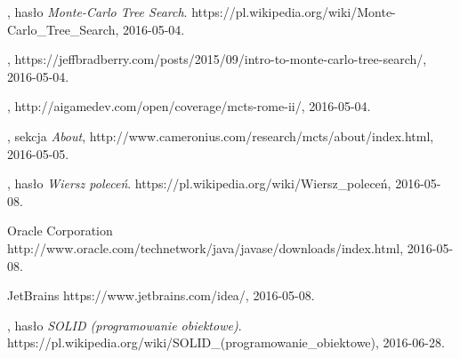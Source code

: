 \documentclass[11pt]{aghdpl}
\begin{document}
\begin{thebibliography}{1}
\bibitem{}
\label{bib:wiki_mcts}
, hasło {\em Monte-Carlo Tree Search}.
\newblock https://pl.wikipedia.org/wiki/Monte-Carlo\_Tree\_Search, 2016-05-04.

\bibitem{}
\label{bib:mcts_wprowadzenie}
,
\newblock https://jeffbradberry.com/posts/2015/09/intro-to-monte-carlo-tree-search/, 2016-05-04.

\bibitem{}
\label{bib:mcts_totalWar}
,
\newblock http://aigamedev.com/open/coverage/mcts-rome-ii/, 2016-05-04.

\bibitem{}
\label{bib:mcts_uct}
, sekcja {\em About},
\newblock http://www.cameronius.com/research/mcts/about/index.html, 2016-05-05.

\bibitem{}
\label{bib:wiki_wierszPolecen}
, hasło {\em Wiersz poleceń}.
\newblock https://pl.wikipedia.org/wiki/Wiersz\_poleceń, 2016-05-08.

\bibitem{}
\label{bib:java}
Oracle Corporation
\newblock http://www.oracle.com/technetwork/java/javase/downloads/index.html, 2016-05-08.

\bibitem{}
\label{bib:intellij}
JetBrains
\newblock https://www.jetbrains.com/idea/, 2016-05-08.

\bibitem{}
\label{bib:wiki_SOLID}
, hasło {\em SOLID (programowanie obiektowe)}.
\newblock https://pl.wikipedia.org/wiki/SOLID\_(programowanie\_obiektowe), 2016-06-28.

\end{thebibliography}
\end{document}
